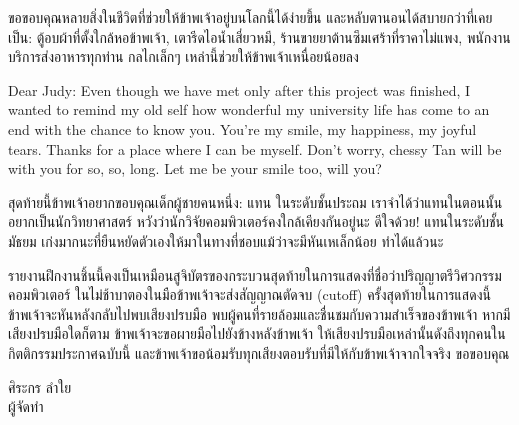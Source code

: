 ขอขอบคุณหลายสิ่งในชีวิตที่ช่วยให้ข้าพเจ้าอยู่บนโลกนี้ได้ง่ายขึ้น และหลับตานอนได้สบายกว่าที่เคยเป็น: ตู้อบผ้าที่ตั้งใกล้หอข้าพเจ้า, เตารีดไอน้ำเสี่ยวหมี, ร้านขายยาต้านซึมเศร้าที่ราคาไม่แพง, พนักงานบริการส่งอาหารทุกท่าน กลไกเล็กๆ เหล่านี้ช่วยให้ข้าพเจ้าเหนื่อยน้อยลง

Dear Judy: Even though we have met only after this project was finished, I wanted to remind my old self how wonderful my university life has come to an end with the chance to know you. You're my smile, my happiness, my joyful tears. Thanks for a place where I can be myself. Don't worry, chessy Tan will be with you for so, so, long. Let me be your smile too, will you?

สุดท้ายนี้ข้าพเจ้าอยากขอบคุณเด็กผู้ชายคนหนึ่ง: แทน ในระดับชั้นประถม  เราจำได้ว่าแทนในตอนนั้นอยากเป็นนักวิทยาศาสตร์ หวังว่านักวิจัยคอมพิวเตอร์คงใกล้เคียงกันอยู่นะ ดีใจด้วย! แทนในระดับชั้นมัธยม เก่งมากนะที่ยืนหยัดตัวเองให้มาในทางที่ชอบแม้ว่าจะมีหันเหเล็กน้อย ทำได้แล้วนะ

รายงานฝึกงานชิ้นนี้คงเป็นเหมือนสูจิบัตรของกระบวนสุดท้ายในการแสดงที่ชื่อว่าปริญญาตรีวิศวกรรมคอมพิวเตอร์ ในไม่ช้าบาตองในมือข้าพเจ้าจะส่งสัญญาณตัดจบ (cutoff) ครั้งสุดท้ายในการแสดงนี้ ข้าพเจ้าจะหันหลังกลับไปพบเสียงปรบมือ พบผู้คนที่รายล้อมและชื่นชมกับความสำเร็จของข้าพเจ้า หากมีเสียงปรบมือใดก็ตาม ข้าพเจ้าจะขอผายมือไปยังข้างหลังข้าพเจ้า ให้เสียงปรบมือเหล่านั้นดังถึงทุกคนในกิตติกรรมประกาศฉบับนี้ และข้าพเจ้าขอน้อมรับทุกเสียงตอบรับที่มีให้กับข้าพเจ้าจากใจจริง ขอขอบคุณ

\vskip 20pt

\hfill\begin{minipage}
    {\dimexpr 5cm}
    \begin{center}
        ศิระกร ลำใย\\
        ผู้จัดทำ
    \end{center}
    \xdef\tpd{\the\prevdepth}
\end{minipage}